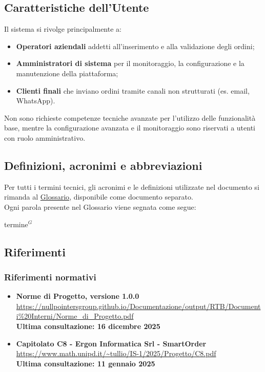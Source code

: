 	\subsection{Caratteristiche dell'Utente}
	Il sistema si rivolge principalmente a:
	\begin{itemize}
	    \item \textbf{Operatori aziendali} addetti all'inserimento e alla validazione degli ordini;
	    \item \textbf{Amministratori di sistema} per il monitoraggio, la configurazione e la manutenzione della piattaforma;
	    \item \textbf{Clienti finali} che inviano ordini tramite canali non strutturati (es. email, WhatsApp).
	\end{itemize}
	Non sono richieste competenze tecniche avanzate per l'utilizzo delle funzionalità base, mentre la configurazione avanzata e il monitoraggio sono riservati a utenti con ruolo amministrativo.

	\subsection{Definizioni, acronimi e abbreviazioni}
	Per tutti i termini tecnici, gli acronimi e le definizioni utilizzate nel documento si rimanda al \href{https://nullpointersgroup.github.io/Documentazione/output/RTB/Documentazione_interna/Glossario.pdf}{Glossario}, disponibile come documento separato. \\
	Ogni parola presente nel Glossario viene segnata come segue:
	\begin{center}
        termine$^{G}$
    \end{center}

	\subsection{Riferimenti}
	\subsubsection{Riferimenti normativi}
	\begin{itemize}[itemsep=5pt, parsep=5pt, label=$\scriptstyle\bullet$]
	
	\item \textbf{Norme di Progetto, versione 1.0.0} \\
	\url{https://nullpointersgroup.github.io/Documentazione/output/RTB/Documenti%20Interni/Norme_di_Progetto.pdf}\\[3pt]
	\textbf{Ultima consultazione: 16 dicembre 2025}
	
	\item \textbf{Capitolato C8 - Ergon Informatica Srl - SmartOrder} \\
	\url{https://www.math.unipd.it/~tullio/IS-1/2025/Progetto/C8.pdf}\\[3pt]
	\textbf{Ultima consultazione: 11 gennaio 2025}
	
	\end{itemize}
	
